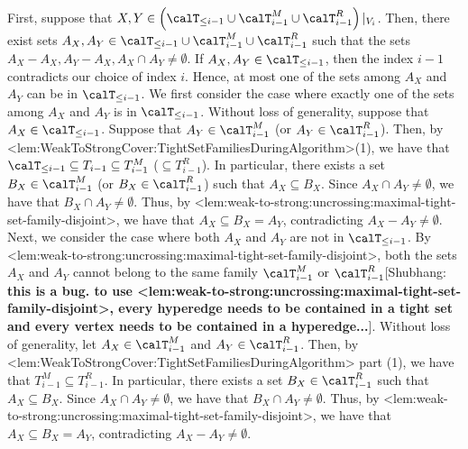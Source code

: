 \documentclass{article}
\def\Cref#1{<#1>}%
\newcommand{\maximalTightSetFamily}[1]{\ensuremath{\calT_{#1}}\xspace}
\newcommand{\tightSetFamily}[1]{\ensuremath{T_{#1}}\xspace}
\newcommand{\cumulativeMaximalTightSetFamily}[1]{\ensuremath{\calT_{\leq #1}}}
\newcommand{\projCumulativeMaximalTightSetFamily}[2]{\ensuremath{\calT_{\leq #1}|_{V_{#2}}}}
\newcommand{\maximalTightSetFamilyAfterMerge}[1]{\ensuremath{\calT_{#1}^M}\xspace}
\newcommand{\maximalTightSetFamilyAfterReduce}[1]{\ensuremath{\calT_{#1}^R}\xspace}
\newcommand{\tightSetFamilyAfterMerge}[1]{\ensuremath{T_{#1}^M}\xspace}
\newcommand{\tightSetFamilyAfterReduce}[1]{\ensuremath{T_{#1}^R}\xspace}
\newcommand{\shubhang}[1]{{\color{blue}[{\tiny Shubhang: \bf #1}]\marginpar{\color{blue}*}}}
\begin{document}
        First, suppose that $X, Y \in \left(\cumulativeMaximalTightSetFamily{i-1} \cup \maximalTightSetFamily{i-1}^M \cup \maximalTightSetFamily{i-1}^R\right)|_{V_i}$. Then, there exist sets $A_X, A_Y \in \cumulativeMaximalTightSetFamily{i-1} \cup \maximalTightSetFamily{i-1}^M \cup \maximalTightSetFamily{i-1}^R$ such that the sets $A_X-A_X, A_Y-A_X, A_X\cap A_Y\neq \emptyset$. If $A_X, A_Y \in \cumulativeMaximalTightSetFamily{{i-1}}$, then the index $i-1$ contradicts our choice of index $i$. Hence, at most one of the sets among $A_X$ and $A_Y$ can be in $\cumulativeMaximalTightSetFamily{{i-1}}$. 
        We first consider the case where exactly one of the sets among $A_X$ and $A_Y$ is in $\cumulativeMaximalTightSetFamily{{i-1}}$. Without loss of generality, suppose that $A_X \in \cumulativeMaximalTightSetFamily{i-1}$. Suppose that $A_Y \in \maximalTightSetFamilyAfterMerge{i-1}$ (or $A_Y\in \maximalTightSetFamilyAfterReduce{i-1}$). Then, by \Cref{lem:WeakToStrongCover:TightSetFamiliesDuringAlgorithm}(1), we have that $\cumulativeMaximalTightSetFamily{i-1} \subseteq \tightSetFamily{i-1} \subseteq \tightSetFamilyAfterMerge{i-1}$ ($\subseteq \tightSetFamilyAfterReduce{i-1}$). In particular, there exists a set $B_X \in \maximalTightSetFamilyAfterMerge{i-1}$ (or $B_X \in \maximalTightSetFamilyAfterReduce{i-1}$) such that $A_X\subseteq B_X$. Since $A_X \cap A_Y \not = \emptyset$, we have that $B_X \cap A_Y \not = \emptyset$. Thus, by \Cref{lem:weak-to-strong:uncrossing:maximal-tight-set-family-disjoint}, we have that $A_X \subseteq B_X = A_Y$, contradicting $A_X-A_Y\neq \emptyset$. 
        Next, we consider the case where both $A_X$ and $A_Y$ are not in $\cumulativeMaximalTightSetFamily{{i-1}}$. By \Cref{lem:weak-to-strong:uncrossing:maximal-tight-set-family-disjoint}, both the sets $A_X$ and $A_Y$ cannot belong to the same family $\maximalTightSetFamilyAfterMerge{i-1}$ or $\maximalTightSetFamilyAfterReduce{i-1}$\shubhang{this is a bug. to use \Cref{lem:weak-to-strong:uncrossing:maximal-tight-set-family-disjoint}, every hyperedge needs to be contained in a tight set and every vertex needs to be contained in a hyperedge...}. Without loss of generality, let $A_X\in \maximalTightSetFamily{i-1}^M $ and $A_Y\in \maximalTightSetFamily{i-1}^R$. Then, by \Cref{lem:WeakToStrongCover:TightSetFamiliesDuringAlgorithm} part (1), we have that $\tightSetFamilyAfterMerge{i-1}\subseteq \tightSetFamilyAfterReduce{i-1}$. In particular, there exists a set $B_X \in \maximalTightSetFamilyAfterReduce{i-1}$ such that $A_X\subseteq B_X$. Since $A_X \cap A_Y \not = \emptyset$, we have that $B_X \cap A_Y \not = \emptyset$. Thus, by \Cref{lem:weak-to-strong:uncrossing:maximal-tight-set-family-disjoint}, we have that $A_X \subseteq B_X = A_Y$, contradicting $A_X-A_Y\neq \emptyset$. 
        
\end{document}
